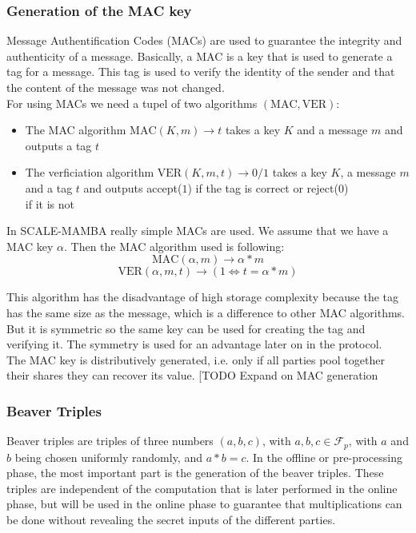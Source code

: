 \documentclass[english,runningheads,a4paper]{llncs}[2018/03/10]
\begin{document}
\subsubsection{Generation of the MAC key}
Message Authentification Codes (MACs) are used to guarantee the integrity and authenticity of a message. Basically, a MAC is a key that is used to generate a tag for a message. This tag is used to verify the identity of the sender and that the content of the message was not changed.\\
For using MACs we need a tupel of two algorithms \((\text{MAC},\text{VER})\):\\
\begin{itemize}
\item The MAC algorithm \(\text{MAC}(K,m)\rightarrow t\) takes a key \(K\) and a message \(m\) and outputs a tag \(t\)\\
\item The verficiation algorithm \(\text{VER}(K,m,t)\rightarrow 0/1\) takes a key \(K\), a message \(m\) and a tag \(t\) and outputs accept(\(1\)) if the tag is correct or reject(\(0\))\\ if it is not
\end{itemize}

In SCALE-MAMBA really simple MACs are used. We assume that we have a MAC key \( \alpha \). Then the MAC algorithm used is following:\\
$$\text{MAC}(\alpha,m)\rightarrow \alpha * m$$ 
$$\text{VER}(\alpha,m,t)\rightarrow (1 \Leftrightarrow t = \alpha*m) $$ 


This algorithm has the disadvantage of high storage complexity because the tag has the same size as the message, which is a difference to other MAC algorithms. But it is symmetric so the same key can be used for creating the tag and verifying it. The symmetry is used for an advantage later on in the protocol.\\



The MAC key is distributively generated, i.e. only if all parties pool together their shares they can recover its value. 
[TODO Expand on MAC generation


\subsubsection{Beaver Triples}

Beaver triples are triples of three numbers \((a,b,c)\), with \( a,b,c\in \mathcal{F}_p \), with \(a\) and \(b\) being chosen uniformly randomly, and \(a*b=c\).
In the offline or pre-processing phase, the most important part is the generation of the beaver triples. These triples  are independent of the computation that is later performed in the online phase, but will be used in the online phase to guarantee that multiplications can be done without revealing the secret inputs of the different parties.\\
\end{document}
